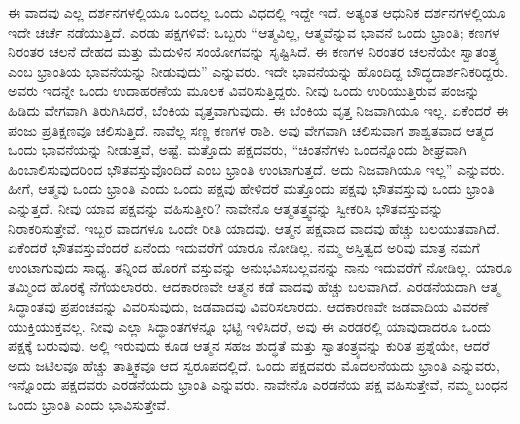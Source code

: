 \vskip 0.2cm 

ಈ ವಾದವು ಎಲ್ಲ ದರ್ಶನಗಳಲ್ಲಿಯೂ ಒಂದಲ್ಲ ಒಂದು ವಿಧದಲ್ಲಿ ಇದ್ದೇ ಇದೆ. ಅತ್ಯಂತ ಆಧುನಿಕ ದರ್ಶನಗಳಲ್ಲಿಯೂ ಇದೇ ಚರ್ಚೆ ನಡೆಯುತ್ತಿದೆ. ಎರಡು ಪಕ್ಷಗಳಿವೆ: ಒಬ್ಬರು “ಆತ್ಮವಿಲ್ಲ, ಆತ್ಮವೆನ್ನುವ ಭಾವನೆ ಒಂದು ಭ್ರಾಂತಿ; ಕಣಗಳ ನಿರಂತರ ಚಲನೆ ದೇಹದ ಮತ್ತು ಮೆದುಳಿನ ಸಂಯೋಗವನ್ನು ಸೃಷ್ಟಿಸಿದೆ. ಈ ಕಣಗಳ ನಿರಂತರ ಚಲನೆಯೇ ಸ್ವಾತಂತ್ರ್ಯ ಎಂಬ ಭ್ರಾಂತಿಯ ಭಾವನೆಯನ್ನು ನೀಡುವುದು” ಎನ್ನುವರು. ಇದೇ ಭಾವನೆಯನ್ನು ಹೊಂದಿದ್ದ ಬೌದ್ಧದಾರ್ಶನಿಕರಿದ್ದರು. ಅವರು ಇದನ್ನೇ ಒಂದು ಉದಾಹರಣೆಯ ಮೂಲಕ ವಿವರಿಸುತ್ತಿದ್ದರು. ನೀವು ಒಂದು ಉರಿಯುತ್ತಿರುವ ಪಂಜನ್ನು ಹಿಡಿದು ವೇಗವಾಗಿ ತಿರುಗಿಸಿದರೆ, ಬೆಂಕಿಯ ವೃತ್ತವಾಗುವುದು. ಈ ಬೆಂಕಿಯ ವೃತ್ತ ನಿಜವಾಗಿಯೂ ಇಲ್ಲ. ಏಕೆಂದರೆ ಈ ಪಂಜು ಪ್ರತಿಕ್ಷಣವೂ ಚಲಿಸುತ್ತಿದೆ. ನಾವೆಲ್ಲ ಸಣ್ಣ ಕಣಗಳ ರಾಶಿ. ಅವು ವೇಗವಾಗಿ ಚಲಿಸುವಾಗ ಶಾಶ್ವತವಾದ ಆತ್ಮದ ಒಂದು ಭಾವನೆಯನ್ನು ನೀಡುತ್ತವೆ, ಅಷ್ಟೆ. ಮತ್ತೊದು ಪಕ್ಷದವರು, “ಚಿಂತನೆಗಳು ಒಂದನ್ನೊಂದು ಶೀಘ್ರವಾಗಿ ಹಿಂಬಾಲಿಸುವುದರಿಂದ ಭೌತವಸ್ತುವೊಂದಿದೆ ಎಂಬ ಭ್ರಾಂತಿ ಉಂಟಾಗುತ್ತದೆ. ಅದು ನಿಜವಾಗಿಯೂ ಇಲ್ಲ” ಎನ್ನುವರು. ಹೀಗೆ, ಆತ್ಮವು ಒಂದು ಭ್ರಾಂತಿ ಎಂದು ಒಂದು ಪಕ್ಷವು ಹೇಳಿದರೆ ಮತ್ತೊಂದು ಪಕ್ಷವು ಭೌತವಸ್ತುವು ಒಂದು ಭ್ರಾಂತಿ ಎನ್ನುತ್ತದೆ. ನೀವು ಯಾವ ಪಕ್ಷವನ್ನು ವಹಿಸುತ್ತೀರಿ? ನಾವೇನೊ ಆತ್ಮತತ್ತ್ವವನ್ನು ಸ್ವೀಕರಿಸಿ ಭೌತವಸ್ತುವನ್ನು ನಿರಾಕರಿಸುತ್ತೇವೆ. ಇಬ್ಬರ ವಾದಗಳೂ ಒಂದೇ ರೀತಿ ಯಾದವು. ಆತ್ಮನ ಪಕ್ಷವಾದ ವಾದವು ಹೆಚ್ಚು ಬಲಯುತವಾಗಿದೆ. ಏಕೆಂದರೆ ಭೌತವಸ್ತುವೆಂದರೆ ಏನೆಂದು ಇದುವರೆಗೆ ಯಾರೂ ನೋಡಿಲ್ಲ. ನಮ್ಮ ಅಸ್ತಿತ್ವದ ಅರಿವು ಮಾತ್ರ ನಮಗೆ ಉಂಟಾಗುವುದು ಸಾಧ್ಯ. ತನ್ನಿಂದ ಹೊರಗೆ ವಸ್ತುವನ್ನು ಅನುಭವಿಸಬಲ್ಲವನನ್ನು ನಾನು ಇದುವರೆಗೆ ನೋಡಿಲ್ಲ. ಯಾರೂ ತಮ್ಮಿಂದ ಹೊರಕ್ಕೆ  ನೆಗೆಯಲಾರರು. ಆದಕಾರಣವೇ ಆತ್ಮನ ಕಡೆ ವಾದವು ಹೆಚ್ಚು ಬಲವಾಗಿದೆ. ಎರಡನೆಯದಾಗಿ ಆತ್ಮ ಸಿದ್ಧಾಂತವು ಪ್ರಪಂಚವನ್ನು ವಿವರಿಸುವುದು, ಜಡವಾದವು ವಿವರಿಸಲಾರದು. ಆದಕಾರಣವೇ ಜಡವಾದಿಯ ವಿವರಣೆ ಯುಕ್ತಿಯುಕ್ತವಲ್ಲ. ನೀವು ಎಲ್ಲಾ ಸಿದ್ಧಾಂತಗಳನ್ನೂ ಭಟ್ಟಿ ಇಳಿಸಿದರೆ, ಅವು ಈ ಎರಡರಲ್ಲಿ ಯಾವುದಾದರೂ ಒಂದು ಪಕ್ಷಕ್ಕೆ ಬರುವುವು. ಅಲ್ಲಿ ಇರುವುದು ಕೂಡ ಆತ್ಮನ ಸಹಜ ಶುದ್ಧತೆ ಮತ್ತು ಸ್ವಾತಂತ್ರ್ಯವನ್ನು ಕುರಿತ ಪ್ರಶ್ನೆಯೇ, ಆದರೆ ಅದು ಜಟಿಲವೂ ಹೆಚ್ಚು ತಾತ್ತ್ವಿಕವೂ ಆದ ಸ್ವರೂಪದಲ್ಲಿದೆ. ಒಂದು ಪಕ್ಷದವರು ಮೊದಲನೆಯದು ಭ್ರಾಂತಿ ಎನ್ನುವರು, ಇನ್ನೊಂದು ಪಕ್ಷದವರು ಎರಡನೆಯದು ಭ್ರಾಂತಿ ಎನ್ನುವರು. ನಾವೇನೊ ಎರಡನೆಯ ಪಕ್ಷ ವಹಿಸುತ್ತೇವೆ, ನಮ್ಮ ಬಂಧನ ಒಂದು ಭ್ರಾಂತಿ ಎಂದು ಭಾವಿಸುತ್ತೇವೆ.


